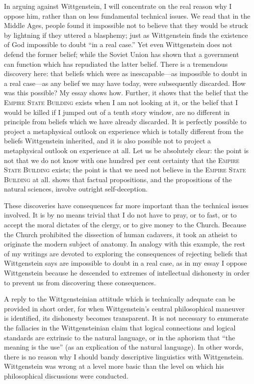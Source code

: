 \begin{enumerate}[label=\textbf{\Alph*.}, wide, nosep, itemsep=1em]
In arguing against Wittgenstein, I will concentrate on the real reason 
why I oppose him, rather than on less fundamental technical issues. We read 
that in the Middle Ages, people found it impossible not to believe that they 
would be struck by lightning if they uttered a blasphemy; just as 
Wittgenstein finds the existence of God impossible to doubt \enquote{in a real case.} 
Yet even Wittgenstein does not defend the former belief; while the Soviet 
Union has shown that a government can function which has repudiated the 
latter belief. There is a tremendous discovery here: that beliefs which were as 
inescapable---as impossible to doubt in a real case---as any belief we may have 
today, were subsequently discarded. How was this possible? My essay  shows how. Further, it shows that the belief that 
the \textsc{Empire State Building} exists when I am not looking at it, or the belief 
that I would be killed if I jumped out of a tenth story window, are no 
different in principle from beliefs which we have already discarded. It is 
perfectly possible to project a metaphysical outlook on experience which is 
totally different from the beliefs Wittgenstein inherited, and it is also 
possible not to project a metaphysical outlook on experience at all. Let us be 
absolutely clear: the point is not that we do not know with one hundred per 
cent certainty that the \textsc{Empire State Building} exists; the point is that we 
need not believe in the \textsc{Empire State Building} at all.  shows that factual propositions, and the propositions of the natural 
sciences, involve outright self-deception. 

These discoveries have consequences far more important than the 
technical issues involved. It is by no means trivial that I do not have to pray, 
or to fast, or to accept the moral dictates of the clergy, or to give money to 
the Church. Because the Church prohibited the dissection of human 
cadavers, it took an atheist to originate the modern subject of anatomy. In 
analogy with this example, the rest of my writings are devoted to exploring 
the consequences of rejecting beliefs that Wittgenstein says are impossible to 
doubt in a real case, as in my essay  I oppose Wittgenstein because he descended to extremes of 
intellectual dishonesty in order to prevent us from discovering these 
consequences. 

A reply to the Wittgensteinian attitude which is technically adequate 
can be provided in short order, for when Wittgenstein's central philosophical 
maneuver is identified, its dishonesty becomes transparent. It is not 
necessary to enumerate the fallacies in the Wittgensteinian claim that logical 
connections and logical standards are extrinsic to the natural language, or in 
the aphorism that \enquote{the meaning is the use} (as an explication of the natural 
language). In other words, there is no reason why I should bandy descriptive 
linguistics with Wittgenstein. Wittgenstein was wrong at a level more basic 
than the level on which his philosophical discussions were conducted. 


\end{enumerate}
